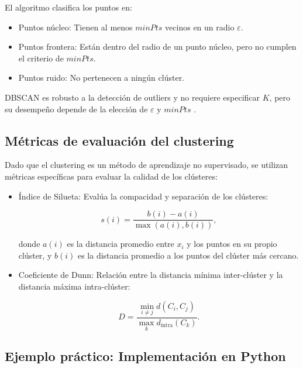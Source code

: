 \begin{itemize}
		El algoritmo clasifica los puntos en:
		
		\begin{itemize}
			\item Puntos núcleo: Tienen al menos \( minPts \) vecinos en un radio \( \varepsilon \).
			\item Puntos frontera: Están dentro del radio de un punto núcleo, pero no cumplen el criterio de \( minPts \).
			\item Puntos ruido: No pertenecen a ningún clúster.
		\end{itemize}
		
		DBSCAN es robusto a la detección de outliers y no requiere especificar \( K \), pero su desempeño depende de la elección de \( \varepsilon \) y \( minPts \) \cite{ester1996density}.
		
		\subsection{Métricas de evaluación del clustering}
		
		Dado que el clustering es un método de aprendizaje no supervisado, se utilizan métricas específicas para evaluar la calidad de los clústeres:
		
		\begin{itemize}
			\item Índice de Silueta: Evalúa la compacidad y separación de los clústeres:
			
			\begin{equation}
				s(i) = \frac{b(i) - a(i)}{\max(a(i), b(i))},
			\end{equation}
			
			donde \( a(i) \) es la distancia promedio entre \( x_i \) y los puntos en su propio clúster, y \( b(i) \) es la distancia promedio a los puntos del clúster más cercano.
			
			\item Coeficiente de Dunn: Relación entre la distancia mínima inter-clúster y la distancia máxima intra-clúster:
			
			\begin{equation}
				D = \frac{\min_{i \neq j} d(C_i, C_j)}{\max_k d_{\text{intra}}(C_k)}.
			\end{equation}
		\end{itemize}
		
		\subsection{Ejemplo práctico: Implementación en Python}
		

\end{itemize}
